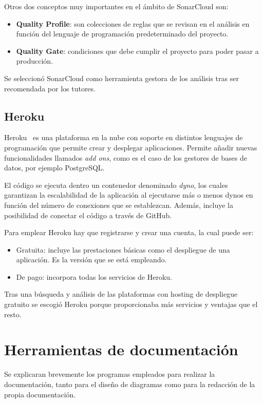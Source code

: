 Otros dos conceptos muy importantes en el ámbito de SonarCloud son:
\begin{itemize}
	\tightlist
	\item \textbf{Quality Profile}: son colecciones de reglas que se revisan en el análisis en función del lenguaje de programación predeterminado del proyecto.
	\item \textbf{Quality Gate}: condiciones que debe cumplir el proyecto para poder pasar a producción.
\end{itemize}

Se seleccionó SonarCloud como herramienta gestora de los análisis tras ser recomendada por los tutores.

\subsection{Heroku}
Heroku~\cite{pagina_heroku} es una plataforma en la nube con soporte en distintos lenguajes de programación que permite crear y desplegar aplicaciones. Permite añadir nuevas funcionalidades llamados \emph{add ons}, como es el caso de los gestores de bases de datos, por ejemplo PostgreSQL. 

El código se ejecuta dentro un contenedor denominado \emph{dyno}, los cuales garantizan la escalabilidad de la aplicación al ejecutarse más o menos dynos en función del número de conexiones que se establezcan. Además, incluye la posibilidad de conectar el código a través de GitHub.

Para emplear Heroku hay que registrarse y crear una cuenta, la cual puede ser:
\begin{itemize}
	\tightlist
	\item Gratuita: incluye las prestaciones básicas como el despliegue de una aplicación. Es la versión que se está empleando. 
	\item De pago: incorpora todas los servicios de Heroku.
\end{itemize}

Tras una búsqueda y análisis de las plataformas con hosting de despliegue gratuito se escogió Heroku porque proporcionaba más servicios y ventajas que el resto.

\section{Herramientas de documentación}
Se explicaran brevemente los programas empleados para realizar la documentación, tanto para el diseño de diagramas como para la redacción de la propia documentación.

